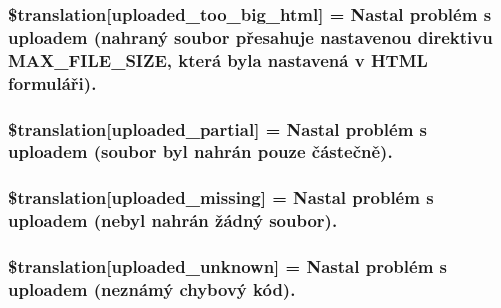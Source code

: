\subsubsection[{\$translation}]{\setlength{\rightskip}{0pt plus 5cm}\$translation\mbox{[}\textquotesingle{}uploaded\+\_\+too\+\_\+big\+\_\+html\textquotesingle{}\mbox{]} = \textquotesingle{}Nastal problém s uploadem (nahraný soubor přesahuje nastavenou direktivu M\+A\+X\+\_\+\+F\+I\+L\+E\+\_\+\+S\+I\+Z\+E, která byla nastavená v H\+T\+M\+L formuláři).\textquotesingle{}}\label{class_8upload_8cs___c_s_8php_a623d5b8b92169f57d7e43458aa911cbb}
\hypertarget{class_8upload_8cs___c_s_8php_a967c17da21b0a2d3bd65cca3a9ca0ea8}{}
\subsubsection[{\$translation}]{\setlength{\rightskip}{0pt plus 5cm}\$translation\mbox{[}\textquotesingle{}uploaded\+\_\+partial\textquotesingle{}\mbox{]} = \textquotesingle{}Nastal problém s uploadem (soubor byl nahrán pouze částečně).\textquotesingle{}}\label{class_8upload_8cs___c_s_8php_a967c17da21b0a2d3bd65cca3a9ca0ea8}
\hypertarget{class_8upload_8cs___c_s_8php_a0cce433260be65f1f35853a6b4b8952b}{}
\subsubsection[{\$translation}]{\setlength{\rightskip}{0pt plus 5cm}\$translation\mbox{[}\textquotesingle{}uploaded\+\_\+missing\textquotesingle{}\mbox{]} = \textquotesingle{}Nastal problém s uploadem (nebyl nahrán žádný soubor).\textquotesingle{}}\label{class_8upload_8cs___c_s_8php_a0cce433260be65f1f35853a6b4b8952b}
\hypertarget{class_8upload_8cs___c_s_8php_a4a9168e922b827e6a28b5db1c00774ca}{}
\subsubsection[{\$translation}]{\setlength{\rightskip}{0pt plus 5cm}\$translation\mbox{[}\textquotesingle{}uploaded\+\_\+unknown\textquotesingle{}\mbox{]} = \textquotesingle{}Nastal problém s uploadem (neznámý chybový kód).\textquotesingle{}}\label{class_8upload_8cs___c_s_8php_a4a9168e922b827e6a28b5db1c00774ca}
\hypertarget{class_8upload_8cs___c_s_8php_a3afc377bd803683314f413a814243066}{}
